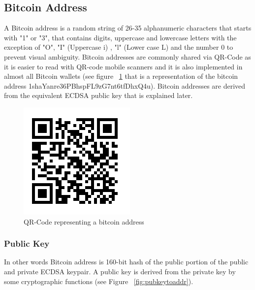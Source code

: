 \subsection{Bitcoin Address}
A Bitcoin address is a random string of 26-35 alphanumeric characters that starts with "1" or "3", that contains digits, uppercase and lowercase letters with the exception of "O", "I" (Uppercase i) , "l" (Lower case L) and the number 0 to prevent visual ambiguity. Bitcoin addresses are commonly shared via QR-Code as it is easier to read with QR-code mobile scanners and it is also implemented in almost all Bitcoin wallets (see figure ~\ref{fig:bitcoinqr} that is a representation of the bitcoin address 1shaYanre36PBhspFL9zG7nt6tfDhxQ4u). Bitcoin addresses are derived from the equivalent ECDSA public key that is explained later.

\begin{figure}
\centering
\includegraphics[scale=0.8]{fig/bitcoinqr.png}
  \caption{QR-Code representing a bitcoin address}
\label{fig:bitcoinqr}
\end{figure}

\subsubsection{Public Key}
 In other words Bitcoin address is 160-bit hash of the public portion of the public and private ECDSA keypair. A public key is derived from the private key by some cryptographic functions (see Figure ~\ref{fig:pubkeytoaddr}). 


